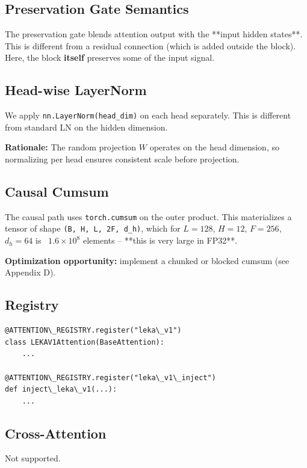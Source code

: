 \subsection{Preservation Gate Semantics}

The preservation gate blends attention output with the **input hidden 
states**. This is different from a residual connection (which is added 
outside the block). Here, the block \textbf{itself} preserves some of the 
input signal.

\subsection{Head-wise LayerNorm}

We apply \texttt{nn.LayerNorm(head\_dim)} on each head separately. This is 
different from standard LN on the hidden dimension.

\textbf{Rationale:} The random projection $W$ operates on the head dimension, 
so normalizing per head ensures consistent scale before projection.

\subsection{Causal Cumsum}

The causal path uses \texttt{torch.cumsum} on the outer product. This materializes 
a tensor of shape \texttt{(B, H, L, 2F, d\_h)}, which for $L=128$, $H=12$, 
$F=256$, $d_h=64$ is ~$1.6 \times 10^8$ elements -- **this is very large 
in FP32**.

\textbf{Optimization opportunity:} implement a chunked or blocked cumsum (see 
Appendix D).

\subsection{Registry}

\begin{lstlisting}
@ATTENTION\_REGISTRY.register("leka\_v1")
class LEKAV1Attention(BaseAttention):
    ...

@ATTENTION\_REGISTRY.register("leka\_v1\_inject")
def inject\_leka\_v1(...):
    ...
\end{lstlisting}

\subsection{Cross-Attention}

Not supported.



